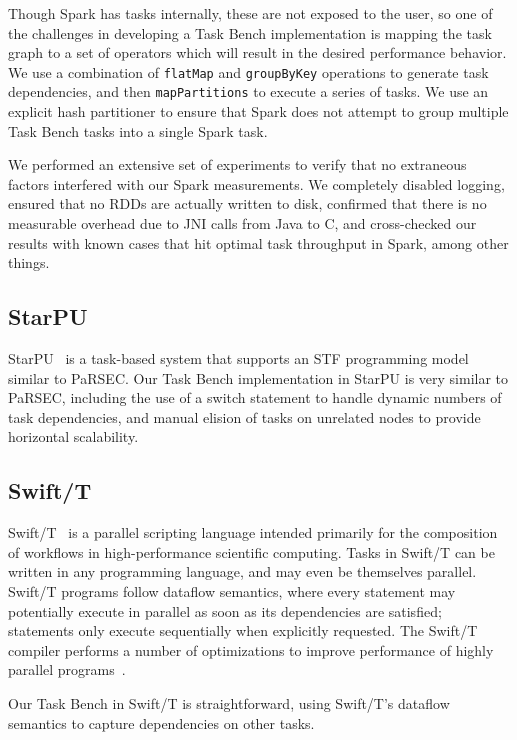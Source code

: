 Though Spark has tasks internally, these are not exposed to the user,
so one of the challenges in developing a Task Bench implementation is
mapping the task graph to a set of operators which will result in the
desired performance behavior. We use a combination of
\lstinline[language=Scala]{flatMap} and
\lstinline[language=Scala]{groupByKey} operations to generate task
dependencies, and then \lstinline[language=Scala]{mapPartitions} to execute a
series of tasks. We use an explicit hash partitioner to ensure that
Spark does not attempt to group multiple Task Bench tasks into a
single Spark task.

We performed an extensive set of experiments to verify that no
extraneous factors interfered with our Spark measurements. We
completely disabled logging, ensured that no RDDs are actually written
to disk, confirmed that there is no measurable overhead due to JNI
calls from Java to C, and cross-checked our results with known cases
that hit optimal task throughput in Spark, among other things.

\subsection{StarPU}

StarPU~\cite{StarPU11} is a task-based system that supports an STF
programming model similar to PaRSEC. Our Task Bench implementation in
StarPU is very similar to PaRSEC, including the use of a switch
statement to handle dynamic numbers of task dependencies, and manual
elision of tasks on unrelated nodes to provide horizontal scalability.

\subsection{Swift/T}

Swift/T~\cite{Wozniak13} is a parallel scripting language intended
primarily for the composition of workflows in high-performance
scientific computing. Tasks in Swift/T can be written in any
programming language, and may even be themselves parallel. Swift/T
programs follow dataflow semantics, where every statement may
potentially execute in parallel as soon as its dependencies are
satisfied; statements only execute sequentially when explicitly
requested. The Swift/T compiler performs a number of optimizations to
improve performance of highly parallel programs~\cite{Armstrong14}.

Our Task Bench in Swift/T is straightforward, using Swift/T's dataflow
semantics to capture dependencies on other tasks.

